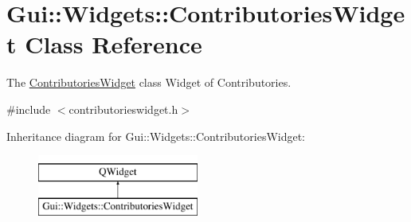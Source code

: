 \hypertarget{classGui_1_1Widgets_1_1ContributoriesWidget}{}\section{Gui\+:\+:Widgets\+:\+:Contributories\+Widget Class Reference}
\label{classGui_1_1Widgets_1_1ContributoriesWidget}


The \hyperlink{classGui_1_1Widgets_1_1ContributoriesWidget}{Contributories\+Widget} class Widget of Contributories.  




{\ttfamily \#include $<$contributorieswidget.\+h$>$}

Inheritance diagram for Gui\+:\+:Widgets\+:\+:Contributories\+Widget\+:\begin{figure}[H]
\begin{center}
\leavevmode
\includegraphics[height=2.000000cm]{dc/da3/classGui_1_1Widgets_1_1ContributoriesWidget}
\end{center}
\end{figure}
